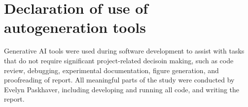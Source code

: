 \documentclass[11pt,a4paper]{article}
\begin{document}
\section*{Declaration of use of autogeneration tools}

Generative AI tools were used during software development to assist with tasks that do not require significant project-related decisoin making, such as code review, debugging, experimental documentation, figure generation, and proofreading of report. All meaningful parts of the study were conducted by Evelyn Paskhaver, including developing and running all code, and writing the report.

\end{document}
